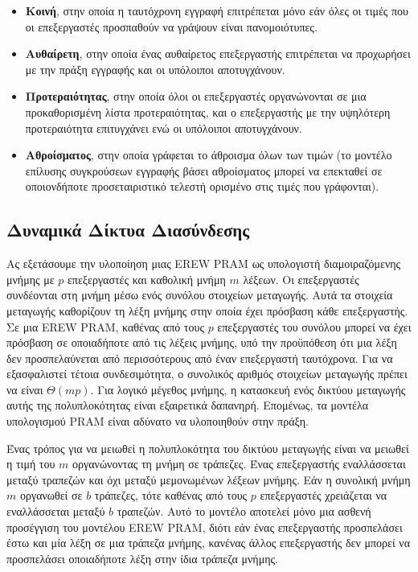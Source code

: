 \documentclass[12pt,a4paper]{article}
\begin{document}
\begin{itemize}
    \item \textbf{Κοινή}, στην οποία η ταυτόχρονη εγγραφή επιτρέπεται μόνο εάν όλες
    οι τιμές που οι επεξεργαστές προσπαθούν να γράψουν είναι πανομοιότυπες.

    \item \textbf{Αυθαίρετη}, στην οποία ένας αυθαίρετος επεξεργαστής επιτρέπεται να
    προχωρήσει με την πράξη εγγραφής και οι υπόλοιποι αποτυγχάνουν.

    \item \textbf{Προτεραιότητας}, στην οποία όλοι οι επεξεργαστές οργανώνονται σε μια
    προκαθορισμένη λίστα προτεραιότητας, και ο επεξεργαστής με την υψηλότερη
    προτεραιότητα επιτυγχάνει ενώ οι υπόλοιποι αποτυγχάνουν.

    \item \textbf{Αθροίσματος}, στην οποία γράφεται το άθροισμα όλων των τιμών (το
    μοντέλο επίλυσης συγκρούσεων εγγραφής βάσει αθροίσματος μπορεί να επεκταθεί
    σε οποιονδήποτε προσεταιριστικό τελεστή ορισμένο στις τιμές που γράφονται).
\end{itemize}

\subsection{Δυναμικά Δίκτυα Διασύνδεσης}
Ας εξετάσουμε την υλοποίηση μιας \foreignlanguage{english}{EREW PRAM} ως υπολογιστή
διαμοιραζόμενης μνήμης με $p$ επεξεργαστές και καθολική μνήμη $m$ λέξεων. Οι επεξεργαστές
συνδέονται στη μνήμη μέσω ενός συνόλου στοιχείων μεταγωγής. Αυτά τα στοιχεία
μεταγωγής καθορίζουν τη λέξη μνήμης στην οποία έχει πρόσβαση κάθε επεξεργαστής.
Σε μια \foreignlanguage{english}{EREW PRAM}, καθένας από τους $p$ επεξεργαστές του
συνόλου μπορεί να έχει πρόσβαση σε οποιαδήποτε από τις λέξεις μνήμης, υπό την
προϋπόθεση ότι μια λέξη δεν προσπελαύνεται από περισσότερους από έναν επεξεργαστή
ταυτόχρονα. Για να εξασφαλιστεί τέτοια συνδεσιμότητα, ο συνολικός αριθμός στοιχείων
μεταγωγής πρέπει να είναι $\Theta(mp)$. Για λογικό μέγεθος μνήμης, η κατασκευή ενός
δικτύου μεταγωγής αυτής της πολυπλοκότητας είναι εξαιρετικά δαπανηρή. Επομένως,
τα μοντέλα υπολογισμού \foreignlanguage{english}{PRAM} είναι αδύνατο να υλοποιηθούν
στην πράξη.

Ένας τρόπος για να μειωθεί η πολυπλοκότητα του δικτύου μεταγωγής είναι να μειωθεί η τιμή του $m$
οργανώνοντας τη μνήμη σε τράπεζες. Ένας επεξεργαστής εναλλάσσεται μεταξύ τραπεζών
και όχι μεταξύ μεμονωμένων λέξεων μνήμης. Εάν η συνολική μνήμη $m$ οργανωθεί σε
$b$ τράπεζες, τότε καθένας από τους $p$ επεξεργαστές χρειάζεται να εναλλάσσεται
μεταξύ $b$ τραπεζών. Αυτό το μοντέλο αποτελεί μόνο μια ασθενή προσέγγιση του
μοντέλου \foreignlanguage{english}{EREW PRAM}, διότι εάν ένας επεξεργαστής
προσπελάσει έστω και μία λέξη σε μια τράπεζα μνήμης, κανένας άλλος επεξεργαστής
δεν μπορεί να προσπελάσει οποιαδήποτε λέξη στην ίδια τράπεζα μνήμης.
\end{document}

